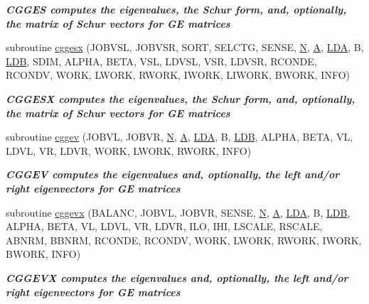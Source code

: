 \begin{DoxyCompactItemize}
\begin{DoxyCompactList}\small\item\em {\bfseries  C\+G\+G\+E\+S computes the eigenvalues, the Schur form, and, optionally, the matrix of Schur vectors for G\+E matrices} \end{DoxyCompactList}\item 
subroutine \hyperlink{group__complexGEeigen_gad4e74f32b6e12e11517fc3884ffcc87d}{cggesx} (J\+O\+B\+V\+S\+L, J\+O\+B\+V\+S\+R, S\+O\+R\+T, S\+E\+L\+C\+T\+G, S\+E\+N\+S\+E, \hyperlink{polmisc_8c_a0240ac851181b84ac374872dc5434ee4}{N}, \hyperlink{classA}{A}, \hyperlink{example__user_8c_ae946da542ce0db94dced19b2ecefd1aa}{L\+D\+A}, B, \hyperlink{example__user_8c_a50e90a7104df172b5a89a06c47fcca04}{L\+D\+B}, S\+D\+I\+M, A\+L\+P\+H\+A, B\+E\+T\+A, V\+S\+L, L\+D\+V\+S\+L, V\+S\+R, L\+D\+V\+S\+R, R\+C\+O\+N\+D\+E, R\+C\+O\+N\+D\+V, W\+O\+R\+K, L\+W\+O\+R\+K, R\+W\+O\+R\+K, I\+W\+O\+R\+K, L\+I\+W\+O\+R\+K, B\+W\+O\+R\+K, I\+N\+F\+O)
\begin{DoxyCompactList}\small\item\em {\bfseries  C\+G\+G\+E\+S\+X computes the eigenvalues, the Schur form, and, optionally, the matrix of Schur vectors for G\+E matrices} \end{DoxyCompactList}\item 
subroutine \hyperlink{group__complexGEeigen_ga791495feb4709cb91cf39a996a5e3f5a}{cggev} (J\+O\+B\+V\+L, J\+O\+B\+V\+R, \hyperlink{polmisc_8c_a0240ac851181b84ac374872dc5434ee4}{N}, \hyperlink{classA}{A}, \hyperlink{example__user_8c_ae946da542ce0db94dced19b2ecefd1aa}{L\+D\+A}, B, \hyperlink{example__user_8c_a50e90a7104df172b5a89a06c47fcca04}{L\+D\+B}, A\+L\+P\+H\+A, B\+E\+T\+A, V\+L, L\+D\+V\+L, V\+R, L\+D\+V\+R, W\+O\+R\+K, L\+W\+O\+R\+K, R\+W\+O\+R\+K, I\+N\+F\+O)
\begin{DoxyCompactList}\small\item\em {\bfseries  C\+G\+G\+E\+V computes the eigenvalues and, optionally, the left and/or right eigenvectors for G\+E matrices} \end{DoxyCompactList}\item 
subroutine \hyperlink{group__complexGEeigen_gad681a6edd407ef1e9ac9b6ee92ddbee3}{cggevx} (B\+A\+L\+A\+N\+C, J\+O\+B\+V\+L, J\+O\+B\+V\+R, S\+E\+N\+S\+E, \hyperlink{polmisc_8c_a0240ac851181b84ac374872dc5434ee4}{N}, \hyperlink{classA}{A}, \hyperlink{example__user_8c_ae946da542ce0db94dced19b2ecefd1aa}{L\+D\+A}, B, \hyperlink{example__user_8c_a50e90a7104df172b5a89a06c47fcca04}{L\+D\+B}, A\+L\+P\+H\+A, B\+E\+T\+A, V\+L, L\+D\+V\+L, V\+R, L\+D\+V\+R, I\+L\+O, I\+H\+I, L\+S\+C\+A\+L\+E, R\+S\+C\+A\+L\+E, A\+B\+N\+R\+M, B\+B\+N\+R\+M, R\+C\+O\+N\+D\+E, R\+C\+O\+N\+D\+V, W\+O\+R\+K, L\+W\+O\+R\+K, R\+W\+O\+R\+K, I\+W\+O\+R\+K, B\+W\+O\+R\+K, I\+N\+F\+O)
\begin{DoxyCompactList}\small\item\em {\bfseries  C\+G\+G\+E\+V\+X computes the eigenvalues and, optionally, the left and/or right eigenvectors for G\+E matrices} \end{DoxyCompactList}\end{DoxyCompactItemize}


